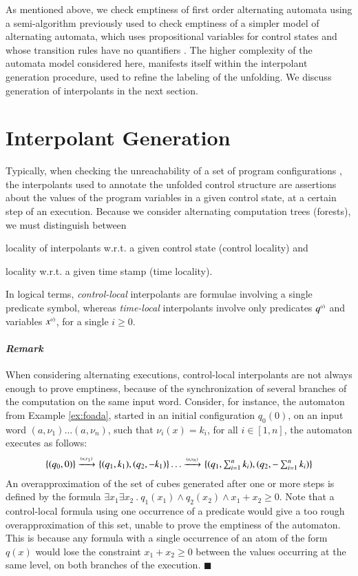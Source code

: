 As mentioned above, we check emptiness of first order alternating
automata using a semi-algorithm previously used to check emptiness of
a simpler model of alternating automata, which uses propositional
variables for control states and whose transition rules have no
quantifiers \cite{IosifXu18}. The higher complexity of the automata
model considered here, manifests itself within the interpolant
generation procedure, used to refine the labeling of the unfolding. We
discuss generation of interpolants in the next section.

\section{Interpolant Generation}\label{sec:interpolants}

Typically, when checking the unreachability of a set of program
configurations \cite{McMillan06}, the interpolants used to annotate
the unfolded control structure are assertions about the values of the
program variables in a given control state, at a certain step of an
execution. Because we consider alternating computation trees
(forests), we must distinguish between
\begin{inparaenum}[(i)]
\item locality of interpolants w.r.t. a given control state (control
  locality) and
%
\item locality w.r.t. a given time stamp (time locality).
\end{inparaenum} 
In logical terms, \emph{control-local} interpolants are formulae
involving a single predicate symbol, whereas \emph{time-local}
interpolants involve only predicates ${q}^{\scriptscriptstyle{({i})}}$ and variables
${x}^{\scriptscriptstyle{({i})}}$, for a single $i \geq 0$.

\paragraph{\em Remark}
When considering alternating executions, control-local interpolants
are not always enough to prove emptiness, because of the
synchronization of several branches of the computation on the same
input word. Consider, for instance, the automaton from Example
\ref{ex:foada}, started in an initial configuration $q_0(0)$, on an
input word $(a,\nu_1) \ldots (a,\nu_n)$, such that $\nu_i(x)=k_i$, for
all $i \in [1,n]$, the automaton executes as follows:
\[\begin{array}{c}
\{ (q_0,0) \} \xrightarrow{{\scriptscriptstyle (a,\nu_1)}}_{{\scriptstyle }} \{ (q_1,k_1),(q_2,-k_1) \} \ldots
\xrightarrow{{\scriptscriptstyle (a,\nu_{n})}}_{{\scriptstyle }} 
\{ (q_1,\sum_{i=1}^{n} k_i),(q_2,-\sum_{i=1}^{n} k_i) \}
\end{array}\]
An overapproximation of the set of cubes generated after one or more
steps is defined by the formula $\exists x_1 \exists x_2 ~.~ q_1(x_1)
\wedge q_2(x_2) \wedge x_1+x_2 \geq 0$. Note that a control-local formula
using one occurrence of a predicate would give a too rough
overapproximation of this set, unable to prove the emptiness of the
automaton. This is because any formula with a single occurrence of an
atom of the form $q(x)$ would lose the constraint $x_1+x_2 \geq 0$
between the values occurring at the same level, on both branches of
the execution. \hfill$\blacksquare$

